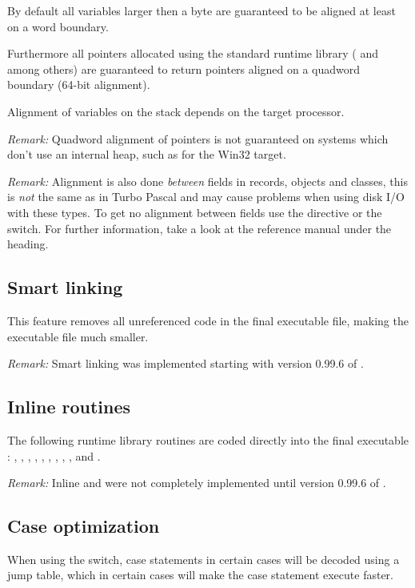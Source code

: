 \documentclass{report}
\begin{document}
By default all variables larger then a byte are guaranteed to be aligned
at least on a word boundary.

Furthermore all pointers allocated using the standard runtime
library ( and  among others) are guaranteed
to return pointers aligned on a quadword boundary (64-bit alignment).

Alignment of variables on the stack depends on the target processor.

\emph{ Remark: } Quadword alignment of pointers is not guaranteed
on systems which don't use an internal heap, such as for the Win32
target.

\emph{ Remark: } Alignment is also done \emph{between} fields in
records, objects and classes, this is \emph{not} the same as
in Turbo Pascal and may cause problems when using disk I/O with these
types. To get no alignment between fields use the  directive
or the  switch. For further information, take a
look at the reference manual under the  heading.

\subsection{ Smart linking }

This feature removes all unreferenced code in the final executable
file, making the executable file much smaller.

\emph{ Remark: } Smart linking was implemented starting with
version 0.99.6 of \fpc.

\subsection{ Inline routines }

The following runtime library routines are coded directly into the
final executable : , , , ,
, , , , ,
 and .

\emph{ Remark: } Inline  and  were not completely
implemented until version 0.99.6 of \fpc.

\subsection{ Case optimization }

When using the  switch, case statements in certain cases will
be decoded using a jump table, which in certain cases will make the
case statement execute faster.
\end{document}
